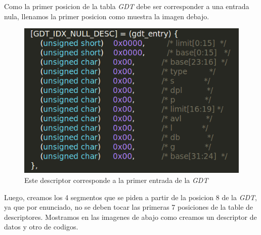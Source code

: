 Como la primer posicion de la tabla \textit{GDT} debe ser corresponder a una entrada nula, llenamos la primer posicion como muestra la imagen debajo.
\\

\begin{figure}[H]
\begin{center}
  \includegraphics[width=\linewidth]{ejercicio1/GDTnula.png}
  \caption{{\small Este descriptor corresponde a la primer entrada de la \textit{GDT}}} 
\endminipage
\end{center}
\end{figure}

Luego, creamos los 4 segmentos que se piden a partir de la posicion 8 de la \textit{GDT}, ya que por enunciado, no se deben tocar las primeras 7 posiciones de la table de descriptores. Mostramos en las imagenes de abajo como creamos un descriptor de datos y otro de codigos. 
\\

